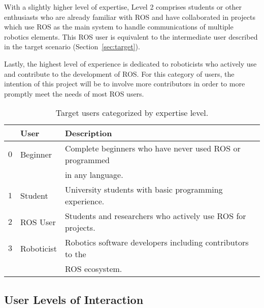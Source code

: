         With a slightly higher level of expertise, Level 2 comprises students or
        other enthusiasts who are already familiar with \ac{ROS} and have collaborated
        in projects which use \ac{ROS} as the main system to handle communications
        of multiple robotics elements. This ROS user is equivalent to the intermediate
        user described in the target scenario (Section~\ref{sec:target}).

        Lastly, the highest level of experience is dedicated to roboticists who
        actively use and contribute to the development of \ac{ROS}. For this 
        category of users, the intention of this project will be to involve more
        contributors in order to more promptly meet the needs of most \ac{ROS} users.



        \begin{table}[htbp]
            \color{textColor}
            \centering	
            \caption{Target users categorized by expertise level.}
                \begin{tabular}{rll}
                    \toprule
                    & \textbf{User}   & \textbf{Description} \\
                    \midrule
                    $0$ & Beginner    & Complete beginners who have never used ROS or programmed \\
                    & & in any language. \\[0.5em]

                    $1$ & Student     & University students with basic programming experience. \\[0.5em]

                    $2$ & ROS User    & Students and researchers who actively use ROS for projects. \\[0.5em]

                    $3$ &  Roboticist & Robotics software developers including contributors to the \\
                    & & ROS ecosystem. \\
                \bottomrule
            \end{tabular}\label{tab:userlevels}
        \end{table}

    \subsection{User Levels of Interaction}

